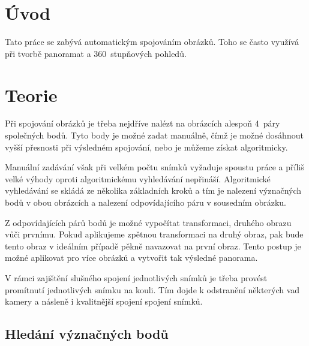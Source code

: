 \documentclass[12pt,a4paper,titlepage,final]{article}
\begin{document}

\def\projname{Počítačové vidění}
\def\projsubname{Skládání snímků}



\pagestyle{plain}
\setcounter{page}{1}
\tableofcontents

\newpage
\pagestyle{plain}
\setcounter{page}{1}

\section{Úvod}

Tato práce se zabývá automatickým spojováním obrázků.
Toho se často využívá při tvorbě panoramat a 360~stupňových pohledů.

\section{Teorie}

Při spojování obrázků je třeba nejdříve nalézt na obrázcích alespoň 4~páry
společných bodů. Tyto body je možné zadat manuálně, čímž je možné dosáhnout
vyšší přesnosti při výsledném spojování, nebo je můžeme získat algoritmicky.

Manuální zadávání však při velkém počtu snímků vyžaduje spoustu práce a příliš
velké výhody oproti algoritmickému vyhledávání nepřináší.
Algoritmické vyhledávání se skládá ze několika základních kroků a tím je nalezení
význačných bodů v obou obrázcích a nalezení odpovídajícího páru v sousedním
obrázku.

Z odpovídajících párů bodů je možné vypočítat transformaci, druhého obrazu vůči
prvnímu. Pokud aplikujeme zpětnou transformaci na druhý obraz, pak bude tento
obraz v ideálním případě pěkně navazovat na první obraz.
Tento postup je možné aplikovat pro více obrázků a vytvořit tak výsledné panorama.

V rámci zajištění slušného spojení jednotlivých snímků je třeba provést promítnutí jednotlivých snímku na kouli. Tím dojde k odstranění některých vad kamery a násleně i kvalitnější spojení spojení snímků.


\subsection{Hledání význačných bodů}
\end{document}
